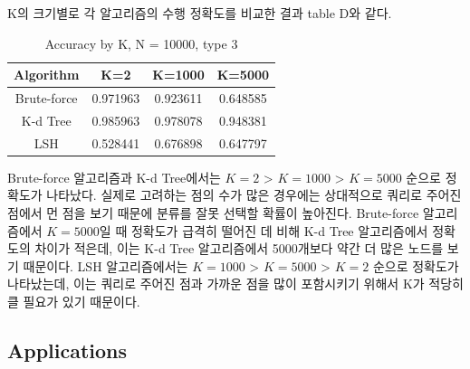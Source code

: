 \documentclass{sig-alternate-05-2015}
\begin{document}
\begin{CJK}{UTF8}{mj}
K의 크기별로 각 알고리즘의 수행 정확도를 비교한 결과 table D와 같다.

\begin{table}
\centering
\caption{Accuracy by K, N = 10000, type 3}
\begin{tabular}{|c|c|c|c|} \hline
Algorithm & K=2 & K=1000 & K=5000 \\ \hline
Brute-force & 0.971963 & 0.923611 & 0.648585 \\ \hline
K-d Tree & 0.985963 & 0.978078 & 0.948381 \\ \hline
LSH & 0.528441 & 0.676898 & 0.647797 \\ 
\hline\end{tabular}
\end{table}

Brute-force 알고리즘과 K-d Tree에서는 $K=2$ > $K=1000$ > $K=5000$ 순으로 정확도가 나타났다. 실제로 고려하는 점의 수가 많은 경우에는 상대적으로 쿼리로 주어진 점에서 먼 점을 보기 때문에 분류를 잘못 선택할 확률이 높아진다. Brute-force 알고리즘에서 $K=5000$일 때 정확도가 급격히 떨어진 데 비해 K-d Tree 알고리즘에서 정확도의 차이가 적은데, 이는 K-d Tree 알고리즘에서 5000개보다 약간 더 많은 노드를 보기 때문이다. LSH 알고리즘에서는 $K=1000$ > $K=5000$ > $K=2$ 순으로 정확도가 나타났는데, 이는 쿼리로 주어진 점과 가까운 점을 많이 포함시키기 위해서 K가 적당히 클 필요가 있기 때문이다.

\subsection{Applications}
\end{CJK}
\end{document}
